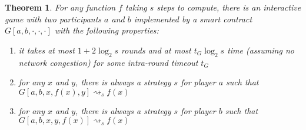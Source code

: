 \documentclass[11pt,letterpaper]{article}
\newtheorem{theorem}[dummytheorem]{Theorem}
\begin{document}
\begin{theorem}
For any function $f$ taking $s$ steps to compute,
there is an interactive game with two participants $a$ and $b$
implemented by a smart contract $G[a,b,\cdot,\cdot,\cdot]$ with the following properties:
\begin{enumerate}
\item it takes at most $1 + 2\log_2 s$ rounds and at most $ t_G \log_2 s$ time
(assuming no network congestion) for some intra-round timeout $t_G$
\item for any $x$ and $y$, there is always a strategy $s$ for player $a$ such that
$G[a,b,x,f(x),y] \rightsquigarrow_s f(x) $
\item for any $x$ and $y$, there is always a strategy $s$ for player $b$ such that
$G[a,b,x,y,f(x)] \rightsquigarrow_s f(x) $
\end{enumerate}
\end{theorem}
\end{document}

